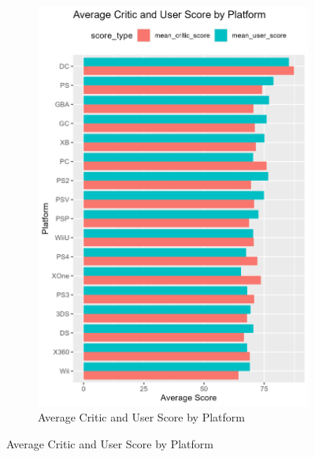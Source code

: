 \documentclass[12pt,english]{article}
\begin{document}
\begin{figure}[ht]
\begin{subfigure}{0.49\linewidth}
    \includegraphics[width=\linewidth]{Figures/avg_scores_platform.png}
    \caption{Average Critic and User Score by Platform}
    \label{fig:fig4}
\end{subfigure}
\label{fig:combined2}
\end{figure}
\end{document}
